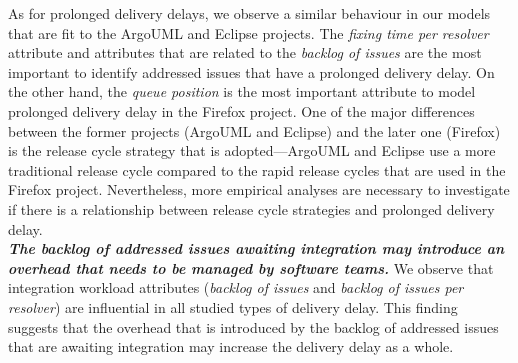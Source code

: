 As for prolonged delivery delays, we observe a similar behaviour in our models that
are fit to the ArgoUML and Eclipse projects. The \textit{fixing time per
resolver} attribute and attributes that are related to the \textit{backlog of
issues} are the most important to identify addressed issues that have a
prolonged delivery delay. On the other hand, the \textit{queue position} is the most
important attribute to model prolonged delivery delay in the Firefox project. One of
the major differences between the former projects (ArgoUML and Eclipse) and the
later one (Firefox) is the release cycle strategy that is adopted---ArgoUML and
Eclipse use a more traditional release cycle compared to the rapid release
cycles that are used in the Firefox project. Nevertheless, more empirical
analyses are necessary to investigate if there is a relationship between release
cycle strategies and prolonged delivery delay.\\

\noindent\textbf{\textit{The backlog of addressed issues awaiting integration
may introduce an overhead that needs to be managed by software teams.}} We
observe that integration workload attributes (\eg \textit{backlog of issues} and
\textit{backlog of issues per resolver}) are influential in all studied types of
delivery delay. This finding suggests that the overhead that is introduced by
the backlog of addressed issues that are awaiting integration may increase the
delivery delay as a whole. 

